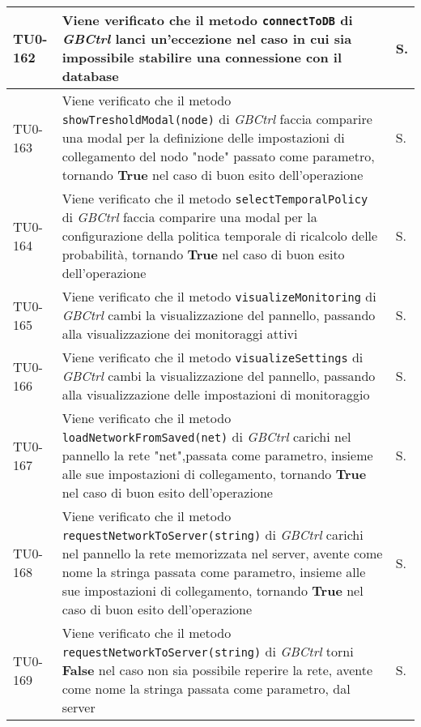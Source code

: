 \begin{longtable}{|C{.15\textwidth}|m{.66\textwidth}|C{.10\textwidth}|}
\hline
TU0-162 & Viene verificato che il metodo \texttt{connectToDB} di \textit{GBCtrl} lanci un'eccezione nel caso in cui sia impossibile stabilire una connessione con il database & S.\\
\hline
{}TU0-163 & Viene verificato che il metodo \texttt{showTresholdModal(node)} di \textit{GBCtrl} faccia comparire una modal per la definizione delle impostazioni di collegamento del nodo "node" passato come parametro, tornando \textbf{True} nel caso di buon esito dell'operazione & S.\\
\hline
TU0-164 & Viene verificato che il metodo \texttt{selectTemporalPolicy} di \textit{GBCtrl} faccia comparire una modal per la configurazione della politica temporale di ricalcolo delle probabilità, tornando \textbf{True} nel caso di buon esito dell'operazione & S.\\
\hline
{}TU0-165 & Viene verificato che il metodo \texttt{visualizeMonitoring} di \textit{GBCtrl} cambi la visualizzazione del pannello, passando alla visualizzazione dei monitoraggi attivi & S.\\
\hline
TU0-166 & Viene verificato che il metodo \texttt{visualizeSettings} di \textit{GBCtrl} cambi la visualizzazione del pannello, passando alla visualizzazione delle impostazioni di monitoraggio & S.\\
\hline
{}TU0-167 & Viene verificato che il metodo \texttt{loadNetworkFromSaved(net)} di \textit{GBCtrl} carichi nel pannello la rete "net",passata come parametro, insieme alle sue impostazioni di collegamento, tornando \textbf{True} nel caso di buon esito dell'operazione & S.\\
\hline
TU0-168 & Viene verificato che il metodo \texttt{requestNetworkToServer(string)} di \textit{GBCtrl} carichi nel pannello la rete memorizzata nel server, avente come nome la stringa passata come parametro, insieme alle sue impostazioni di collegamento, tornando \textbf{True} nel caso di buon esito dell'operazione & S.\\
\hline
{}TU0-169 & Viene verificato che il metodo \texttt{requestNetworkToServer(string)} di \textit{GBCtrl} torni \textbf{False} nel caso non sia possibile reperire la rete, avente come nome la stringa passata come parametro, dal server & S.\\
\hline


\end{longtable}

